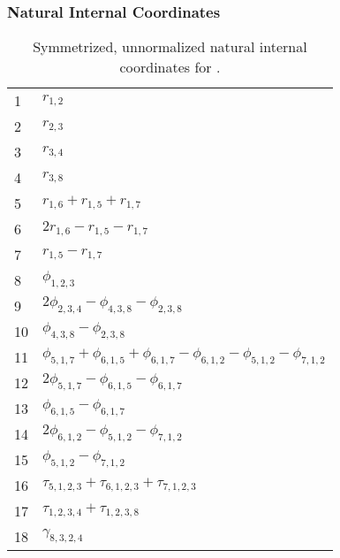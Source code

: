 \documentclass[10pt,oneside]{article}
\begin{document}
\clearpage

\subsubsection*{Natural Internal Coordinates}
\begin{table}[h!]
\centering
\caption{Symmetrized, unnormalized natural internal coordinates for .}
\small
\begin{tabular}{ll}
  1   & $r_{1,2}$ \\
  2   & $r_{2,3}$ \\
  3   & $r_{3,4}$ \\
  4   & $r_{3,8}$ \\
  5   & $r_{1,6} + r_{1,5} + r_{1,7}$ \\
  6   & $2r_{1,6} - r_{1,5} - r_{1,7}$ \\
  7   & $r_{1,5} - r_{1,7}$ \\
  8   & $\phi_{1,2,3}$ \\
  9   & $2\phi_{2,3,4} - \phi_{4,3,8} - \phi_{2,3,8}$ \\
  10  & $\phi_{4,3,8} - \phi_{2,3,8}$ \\
  11  & $\phi_{5,1,7} + \phi_{6,1,5} + \phi_{6,1,7} - \phi_{6,1,2} - \phi_{5,1,2} - \phi_{7,1,2}$ \\
  12  & $2\phi_{5,1,7} - \phi_{6,1,5} - \phi_{6,1,7}$ \\
  13  & $\phi_{6,1,5} - \phi_{6,1,7}$ \\
  14  & $2\phi_{6,1,2} - \phi_{5,1,2} - \phi_{7,1,2}$ \\
  15  & $\phi_{5,1,2} - \phi_{7,1,2}$ \\
  16  & $\tau_{5,1,2,3} + \tau_{6,1,2,3} + \tau_{7,1,2,3}$ \\
  17  & $\tau_{1,2,3,4} + \tau_{1,2,3,8}$ \\
  18  & $\gamma_{8,3,2,4}$ \\
\end{tabular}
\end{table}

\clearpage

\subsection{\ \ \ }
\end{document}
